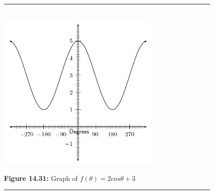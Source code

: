 	\begin{figure}[H] %
    \begin{center}
    \rule[.1in]{\figurerulewidth}{.005in} \\
        \label{m39414*uid52!!!underscore!!!media}\label{m39414*uid52!!!underscore!!!printimage}\includegraphics[width=300px]{col11306.imgs/m39414_trigrep1.png} %
      \vspace{2pt}
    \vspace{\rubberspace}\par \begin{cnxcaption}
	  \small \textbf{Figure 14.31: }Graph of $f\left(\theta \right)=2cos\theta +3$
	\end{cnxcaption}
    \vspace{.1in}
    \rule[.1in]{\figurerulewidth}{.005in} \\
    \end{center}
 \end{figure}       
\label{m39414*secfhsst!!!underscore!!!id2647}
            \nopagebreak
